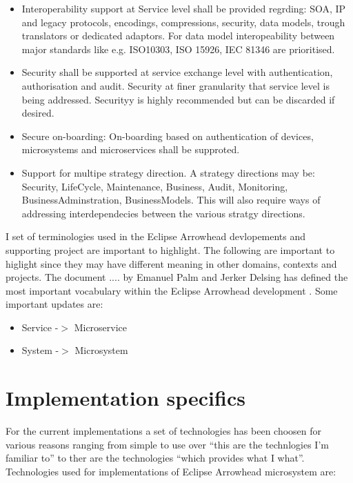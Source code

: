 \documentclass[a4paper]{arrowhead}
\begin{document}
\begin{itemize}
\begin{itemize}
    \item Interoperability support at Service level shall be provided
      regrding: SOA, IP and legacy protocols, encodings, compressions,
      security, data models, trough translators or dedicated
      adaptors. For data model interopeability between major standards
      like e.g. ISO10303, ISO 15926, IEC 81346 are prioritised.
      
    \item Security shall be supported at service exchange level with
      authentication, authorisation and audit. Security at finer
      granularity that service level is being addressed. Securityy is
      highly recommended but can be discarded if desired.  
      
    \item Secure on-boarding: On-boarding based on authentication of
      devices, microsystems and microservices shall be supproted.

    \item Support for multipe strategy direction. A strategy
      directions may be: Security, LifeCycle, Maintenance, Business,
      Audit, Monitoring, BusinessAdminstration, BusinessModels. This
      will also require ways of addressing interdependecies between
      the various stratgy directions.

    \end{itemize}
    
  \end{itemize}
  

I set of terminologies used in the Eclipse Arrowhead devlopements and
supporting project are important to highlight. The following are
important to higlight since they may have different meaning in other
domains, contexts and projects. The document .... by Emanuel Palm and
Jerker Delsing has defined the most important vocabulary within the
Eclipse Arrowhead development \cite{Palm2019}. Some important updates
are:
\begin{itemize}
\item Service -$>$ Microservice
\item System -$>$ Microsystem

\end{itemize}


\section{Implementation specifics}
For the current implementations a set of technologies has been choosen
for various reasons ranging from simple to use over ``this are the
technlogies I'm familiar to'' to ther are the technologies ``which
provides what I what''. Technologies used for implementations of
Eclipse Arrowhead microsystem are:
\end{document}
